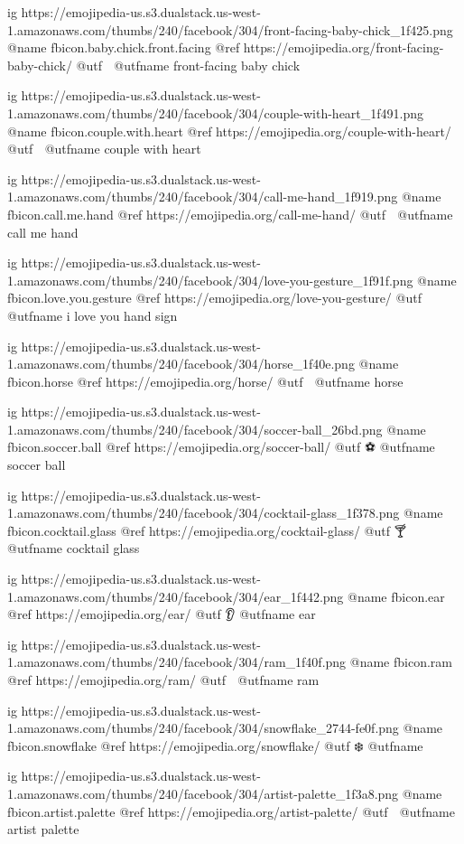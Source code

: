   ig https://emojipedia-us.s3.dualstack.us-west-1.amazonaws.com/thumbs/240/facebook/304/front-facing-baby-chick_1f425.png
  @name fbicon.baby.chick.front.facing
  @ref https://emojipedia.org/front-facing-baby-chick/
  @utf 🐥
  @utfname front-facing baby chick

  ig https://emojipedia-us.s3.dualstack.us-west-1.amazonaws.com/thumbs/240/facebook/304/couple-with-heart_1f491.png
  @name fbicon.couple.with.heart
  @ref https://emojipedia.org/couple-with-heart/
  @utf 💑
  @utfname couple with heart

  ig https://emojipedia-us.s3.dualstack.us-west-1.amazonaws.com/thumbs/240/facebook/304/call-me-hand_1f919.png
  @name fbicon.call.me.hand
  @ref https://emojipedia.org/call-me-hand/
  @utf 🤙
  @utfname call me hand

  ig https://emojipedia-us.s3.dualstack.us-west-1.amazonaws.com/thumbs/240/facebook/304/love-you-gesture_1f91f.png
  @name fbicon.love.you.gesture
  @ref https://emojipedia.org/love-you-gesture/
  @utf 🤟
  @utfname i love you hand sign

  ig https://emojipedia-us.s3.dualstack.us-west-1.amazonaws.com/thumbs/240/facebook/304/horse_1f40e.png
  @name fbicon.horse
  @ref https://emojipedia.org/horse/
  @utf 🐎
  @utfname horse

  ig https://emojipedia-us.s3.dualstack.us-west-1.amazonaws.com/thumbs/240/facebook/304/soccer-ball_26bd.png
  @name fbicon.soccer.ball
  @ref https://emojipedia.org/soccer-ball/
  @utf ⚽
  @utfname soccer ball

  ig https://emojipedia-us.s3.dualstack.us-west-1.amazonaws.com/thumbs/240/facebook/304/cocktail-glass_1f378.png
  @name fbicon.cocktail.glass
  @ref https://emojipedia.org/cocktail-glass/
  @utf 🍸
  @utfname cocktail glass

  ig https://emojipedia-us.s3.dualstack.us-west-1.amazonaws.com/thumbs/240/facebook/304/ear_1f442.png
  @name fbicon.ear
  @ref https://emojipedia.org/ear/
  @utf 👂
  @utfname ear

  ig https://emojipedia-us.s3.dualstack.us-west-1.amazonaws.com/thumbs/240/facebook/304/ram_1f40f.png
  @name fbicon.ram
  @ref https://emojipedia.org/ram/
  @utf 🐏
  @utfname ram

  ig https://emojipedia-us.s3.dualstack.us-west-1.amazonaws.com/thumbs/240/facebook/304/snowflake_2744-fe0f.png
  @name fbicon.snowflake
  @ref https://emojipedia.org/snowflake/
  @utf ❄️
  @utfname

  ig https://emojipedia-us.s3.dualstack.us-west-1.amazonaws.com/thumbs/240/facebook/304/artist-palette_1f3a8.png
  @name fbicon.artist.palette
  @ref https://emojipedia.org/artist-palette/
  @utf 🎨
  @utfname artist palette

